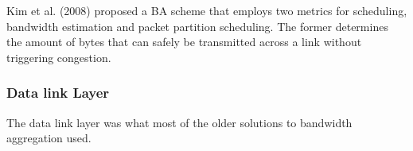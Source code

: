 \documentclass{article}
\begin{document}
Kim et al. (2008) proposed a BA scheme that employs two metrics for scheduling, bandwidth estimation and packet partition scheduling. The former determines the amount of bytes that can safely be transmitted across a link without triggering congestion. 

\subsubsection{Data link Layer}
The data link layer was what most of the older solutions to bandwidth aggregation used.
\end{document}
